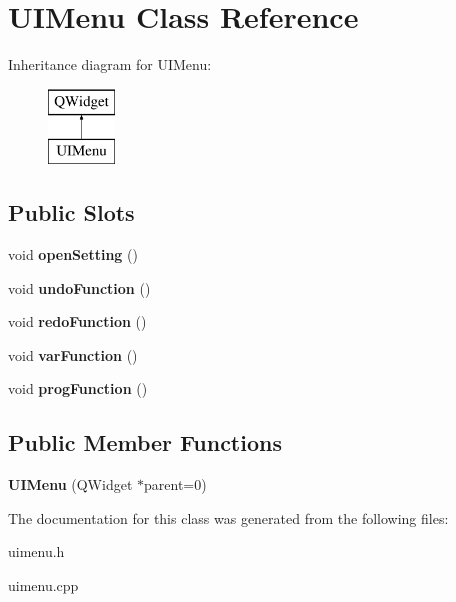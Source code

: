 \hypertarget{class_u_i_menu}{}\section{U\+I\+Menu Class Reference}
\label{class_u_i_menu}
Inheritance diagram for U\+I\+Menu\+:\begin{figure}[H]
\begin{center}
\leavevmode
\includegraphics[height=2.000000cm]{class_u_i_menu}
\end{center}
\end{figure}
\subsection*{Public Slots}
\begin{DoxyCompactItemize}
\item 
void {\bfseries open\+Setting} ()\hypertarget{class_u_i_menu_a5a3a56894aafeb6c990ca94cc6b7458a}{}\label{class_u_i_menu_a5a3a56894aafeb6c990ca94cc6b7458a}

\item 
void {\bfseries undo\+Function} ()\hypertarget{class_u_i_menu_ace94b81e249369e5adbc1d554e20f6c1}{}\label{class_u_i_menu_ace94b81e249369e5adbc1d554e20f6c1}

\item 
void {\bfseries redo\+Function} ()\hypertarget{class_u_i_menu_a4ad7c23f96811ddda0e2482a234a4ac0}{}\label{class_u_i_menu_a4ad7c23f96811ddda0e2482a234a4ac0}

\item 
void {\bfseries var\+Function} ()\hypertarget{class_u_i_menu_a064759b99147b70b46d2620701d7f2f1}{}\label{class_u_i_menu_a064759b99147b70b46d2620701d7f2f1}

\item 
void {\bfseries prog\+Function} ()\hypertarget{class_u_i_menu_a49674d1c1fb2a635a0ffae5bc095c276}{}\label{class_u_i_menu_a49674d1c1fb2a635a0ffae5bc095c276}

\end{DoxyCompactItemize}
\subsection*{Public Member Functions}
\begin{DoxyCompactItemize}
\item 
{\bfseries U\+I\+Menu} (Q\+Widget $\ast$parent=0)\hypertarget{class_u_i_menu_ad89e59164077506ca292f755d4f9f785}{}\label{class_u_i_menu_ad89e59164077506ca292f755d4f9f785}

\end{DoxyCompactItemize}


The documentation for this class was generated from the following files\+:\begin{DoxyCompactItemize}
\item 
uimenu.\+h\item 
uimenu.\+cpp\end{DoxyCompactItemize}
